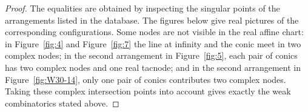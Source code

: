 \documentclass[11pt]{article}
\theoremstyle{plain}
\theoremstyle{definition}
\begin{document}
\begin{proof}

The equalities are obtained by inspecting the singular points of the arrangements listed in the database. The figures below give real pictures of the corresponding configurations. Some nodes are not visible in the real affine chart: in Figure~\ref{fig:4} and Figure~\ref{fig:7} the line at infinity and the conic meet in two complex nodes; in the second arrangement in Figure~\ref{fig:5}, each pair of conics has two complex nodes and one real tacnode; and in the second arrangement in Figure~\ref{fig:W30-14}, only one pair of conics contributes two complex nodes. Taking these complex intersection points into account gives exactly the weak combinatorics stated above.
\end{proof}
\end{document}
